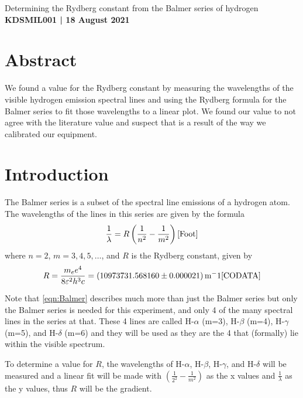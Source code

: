 \documentclass[11pt]{article}
\numberwithin{equation}{section}
\numberwithin{figure}{section}
\numberwithin{table}{section}
\begin{document}
\begin{center}
    {\huge Determining the Rydberg constant from the Balmer series of hydrogen}\\
    \vspace{0.2in}
    \textbf{KDSMIL001 | 18 August 2021}
    
    
    \section*{Abstract}\label{sec:Abstract}
    We found a value for the Rydberg constant by measuring the wavelengths of the visible hydrogen emission spectral lines and using the Rydberg formula for the Balmer series to fit those wavelengths to a linear plot. We found our value to not agree with the literature value and suspect that is a result of the way we calibrated our equipment.
\end{center}
    
\section{Introduction}\label{sec:Introduction}
\par The Balmer series is a subset of the spectral line emissions of a hydrogen atom. The wavelengths of the lines in this series are given by the formula
\begin{equation}
    \frac{1}{\lambda}=R\left(\frac{1}{n^2}-\frac{1}{m^2}\right)\cite{Foot}
    \label{eqn:Balmer}
\end{equation}
where $n=2$, $m=3,4,5,\dots$, and $R$ is the Rydberg constant, given by
\begin{equation}
    R=\frac{m_ee^4}{8\varepsilon^2h^3c}=\SI{10973731.568160(21)}{\metre^-1}\cite{CODATA}
    \label{eqn:Rydberg Constant}
\end{equation}
\par Note that \autoref{eqn:Balmer} describes much more than just the Balmer series but only the Balmer series is needed for this experiment, and only 4 of the many spectral lines in the series at that. These 4 lines are called H-$\alpha$ (m=3), H-$\beta$ (m=4), H-$\gamma$ (m=5), and H-$\delta$ (m=6) and they will be used as they are the 4 that (formally) lie within the visible spectrum.
\par To determine a value for $R$, the wavelengths of H-$\alpha$, H-$\beta$, H-$\gamma$, and H-$\delta$ will be measured and a linear fit will be made with $\left(\frac{1}{2^2}-\frac{1}{m^2}\right)$ as the x values and $\frac{1}{\lambda}$ as the y values, thus $R$ will be the gradient.
\end{document}
